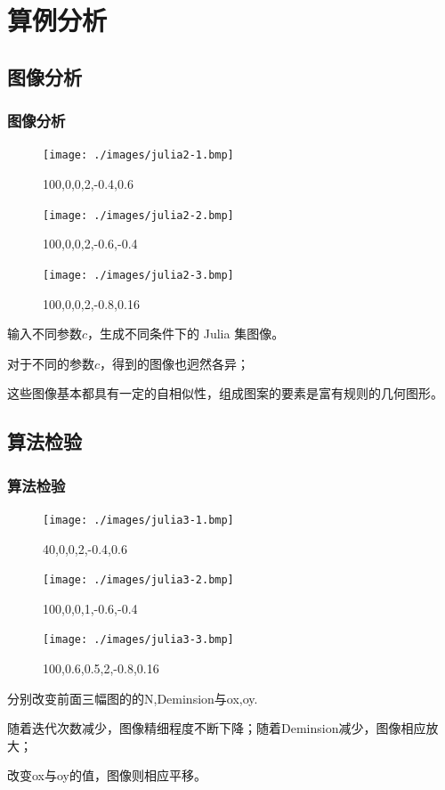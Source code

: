 \documentclass[8pt,c,compress,UTF8]{ctexbeamer}
\begin{document}
\section{算例分析}
\subsection{图像分析}
\begin{frame} 
\frametitle{图像分析}
\begin{figure}[htbp]
\centering
\begin{minipage}{0.33\linewidth}
\centering
\texttt{[image: ./images/julia2-1.bmp]}
\caption*{100,0,0,2,-0.4,0.6}
\label{fig2-1}
\end{minipage}\hfill
\begin{minipage}{0.33\linewidth}
\centering
\texttt{[image: ./images/julia2-2.bmp]}
\caption*{100,0,0,2,-0.6,-0.4}
\label{fig2-2}
\end{minipage}\hfill
\begin{minipage}{0.33\linewidth}
\centering
\texttt{[image: ./images/julia2-3.bmp]}
\caption*{100,0,0,2,-0.8,0.16}
\label{fig2-3}
\end{minipage}
\end{figure}
输入不同参数$c$，生成不同条件下的 Julia 集图像。

对于不同的参数$c$，得到的图像也迥然各异；

这些图像基本都具有一定的自相似性，组成图案的要素是富有规则的几何图形。
\end{frame}

\subsection{算法检验}
\begin{frame} 
\frametitle{算法检验}

\begin{figure}[htbp]
\centering
\begin{minipage}{0.33\linewidth}
\centering
\texttt{[image: ./images/julia3-1.bmp]}
\caption*{40,0,0,2,-0.4,0.6}
\label{fig3-1}
\end{minipage}\hfill
\begin{minipage}{0.33\linewidth}
\centering
\texttt{[image: ./images/julia3-2.bmp]}
\caption*{100,0,0,1,-0.6,-0.4}
\label{fig3-2}
\end{minipage}\hfill
\begin{minipage}{0.33\linewidth}
\centering
\texttt{[image: ./images/julia3-3.bmp]}
\caption*{100,0.6,0.5,2,-0.8,0.16}
\label{fig3-3}
\end{minipage}
\end{figure}
分别改变前面三幅图的的N,Deminsion与ox,oy.

随着迭代次数减少，图像精细程度不断下降；随着Deminsion减少，图像相应放大；

改变ox与oy的值，图像则相应平移。
\end{frame}
\end{document}
